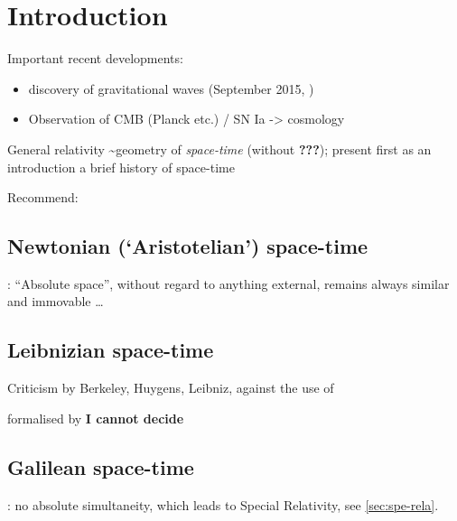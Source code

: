 \section{Introduction}
\label{sec:intro}

\cite{Born_1956}

Important recent developments:
\begin{itemize}
\item discovery of gravitational waves (September 
2015, \cite{PhysRevLett.116.061102})
\item Observation of CMB (Planck etc.) / SN Ia -> cosmology
\end{itemize}

General relativity \textasciitilde geometry of \emph{space-time} (without 
\textbf{???}); present first as an introduction a brief history of space-time

Recommend: \cite[sec.~17: Spacetime]{Penrose_2007}

\subsection{Newtonian (`Aristotelian') space-time}

\cite{Newton_1687}: ``Absolute space'', without regard to anything external, 
remains always similar and immovable \ldots

\subsection{Leibnizian space-time}

Criticism by Berkeley, Huygens, Leibniz, against the use of

formalised by \cite{Lange_1885a,Lange_1885b} \textbf{I cannot decide}

\subsection{Galilean space-time}

\cite{Einstein_1905}: no absolute simultaneity, which leads to Special 
Relativity, see \cref{sec:spe-rela}.